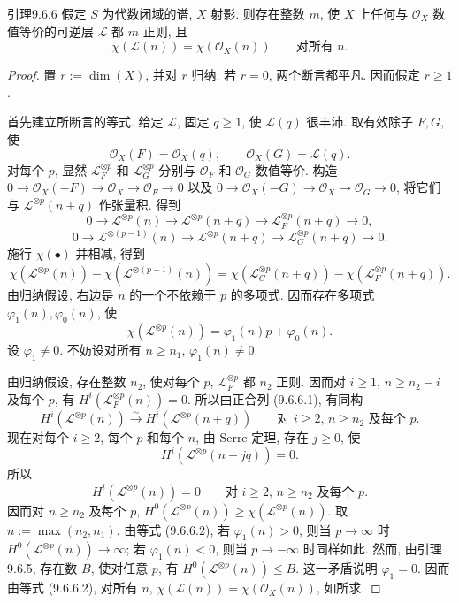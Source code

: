 \begin{origstatement}{引理}{9.6.6}\label{ch09s6:lem966}
假定 $S$ 为代数闭域的谱, $X$ 射影. 则存在整数 $m$, 使 $X$ 上任何与 $\mathcal O_X$ 数值等价的可逆层 $\mathcal L$ 都 $m$ 正则, 且
\[\chi(\mathcal L(n))=\chi(\mathcal O_X(n))\qquad\text{对所有 $n$}.\]
\end{origstatement}
\begin{proof}
置 $r:=\dim(X)$, 并对 $r$ 归纳. 若 $r=0$, 两个断言都平凡. 因而假定 $r\geq1$.

首先建立所断言的等式. 给定 $\mathcal L$, 固定 $q\geq1$, 使 $\mathcal L(q)$ 很丰沛. 取有效除子 $F,G$, 使
\[\mathcal O_X(F)=\mathcal O_X(q),\qquad\mathcal O_X(G)=\mathcal L(q).\]
对每个 $p$, 显然 $\mathcal L_F^{\otimes p}$ 和 $\mathcal L_G^{\otimes p}$ 分别与 $\mathcal O_F$ 和 $\mathcal O_G$ 数值等价. 构造 $0\to\mathcal O_X(-F)\to\mathcal O_X\to\mathcal O_F\to0$ 以及 $0\to\mathcal O_X(-G)\to\mathcal O_X\to\mathcal O_G\to0$, 将它们与 $\mathcal L^{\otimes p}(n+q)$ 作张量积. 得到
\begin{equation}0\longrightarrow\mathcal L^{\otimes p}(n)\longrightarrow\mathcal L^{\otimes p}(n+q)\longrightarrow\mathcal L_F^{\otimes p}(n+q)\longrightarrow0,\tag{9.6.6.1}\label{ch09s6:eq9661}\end{equation}
\[0\longrightarrow\mathcal L^{\otimes(p-1)}(n)\longrightarrow\mathcal L^{\otimes p}(n+q)\longrightarrow\mathcal L_G^{\otimes p}(n+q)\longrightarrow0.\]
施行 $\chi(\bullet)$ 并相减, 得到
\[\chi(\mathcal L^{\otimes p}(n))-\chi(\mathcal L^{\otimes(p-1)}(n))=\chi(\mathcal L_G^{\otimes p}(n+q))-\chi(\mathcal L_F^{\otimes p}(n+q)).\]
由归纳假设, 右边是 $n$ 的一个不依赖于 $p$ 的多项式. 因而存在多项式 $\varphi_1(n),\varphi_0(n)$, 使
\begin{equation}\chi(\mathcal L^{\otimes p}(n))=\varphi_1(n)p+\varphi_0(n).\tag{9.6.6.2}\label{ch09s6:eq9662}\end{equation}
设 $\varphi_1\ne0$. 不妨设对所有 $n\geq n_1$, $\varphi_1(n)\ne0$.

由归纳假设, 存在整数 $n_2$, 使对每个 $p$, $\mathcal L_F^{\otimes p}$ 都 $n_2$ 正则. 因而对 $i\geq1$, $n\geq n_2-i$ 及每个 $p$, 有 $H^i(\mathcal L_F^{\otimes p}(n))=0$. 所以由正合列 (9.6.6.1), 有同构
\[H^i(\mathcal L^{\otimes p}(n))\xrightarrow\sim H^i(\mathcal L^{\otimes p}(n+q))\qquad\text{对 $i\geq2$, $n\geq n_2$ 及每个 $p$}.\]
现在对每个 $i\geq2$, 每个 $p$ 和每个 $n$, 由 Serre 定理, 存在 $j\geq0$, 使
\[H^i(\mathcal L^{\otimes p}(n+jq))=0.\]
所以
\[H^i(\mathcal L^{\otimes p}(n))=0\qquad\text{对 $i\geq2$, $n\geq n_2$ 及每个 $p$}.\]
因而对 $n\geq n_2$ 及每个 $p$, $H^0(\mathcal L^{\otimes p}(n))\geq\chi(\mathcal L^{\otimes p}(n))$. 取 $n:=\max(n_2,n_1)$. 由等式 (9.6.6.2), 若 $\varphi_1(n)>0$, 则当 $p\to\infty$ 时 $H^0(\mathcal L^{\otimes p}(n))\to\infty$; 若 $\varphi_1(n)<0$, 则当 $p\to-\infty$ 时同样如此. 然而, 由引理 9.6.5, 存在数 $B$, 使对任意 $p$, 有 $H^0(\mathcal L^{\otimes p}(n))\leq B$. 这一矛盾说明 $\varphi_1=0$. 因而由等式 (9.6.6.2), 对所有 $n$, $\chi(\mathcal L(n))=\chi(\mathcal O_X(n))$, 如所求.


\end{proof}
